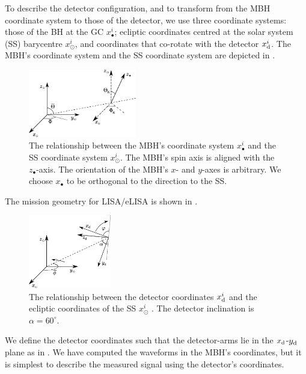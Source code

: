 To describe the detector configuration, and to transform from the MBH coordinate system to those of the detector, we use three coordinate systems: those of the BH at the GC $x_\bullet^i$; ecliptic coordinates centred at the solar system (SS) barycentre $x_\odot^i$, and coordinates that co-rotate with the detector $x_\mathrm{d}^i$. The MBH's coordinate system and the SS coordinate system are depicted in .
\begin{figure}
\begin{center}
 \includegraphics[width=0.42\textwidth]{./images/BH_SS_angles}
    \caption{The relationship between the MBH's coordinate system $x_\bullet^i$ and the SS coordinate system $x_\odot^i$. The MBH's spin axis is aligned with the $z_\bullet$-axis. The orientation of the MBH's $x$- and $y$-axes is arbitrary. We choose $x_\bullet$ to be orthogonal to the direction to the SS.}
   \label{fig:BH_SS}
\end{center}
\end{figure}
The mission geometry for LISA/eLISA is shown in .
\begin{figure}
\begin{center}
 \includegraphics[width=0.32\textwidth]{./images/SS_LISA}
    \caption{The relationship between the detector coordinates $x_\mathrm{d}^i$ and the ecliptic coordinates of the SS $x_\odot^i$ \citep{Bender1998, Jennrich2011}. The detector inclination is $\alpha = 60^{\circ}$.}
   \label{fig:SS_LISA}
\end{center}
\end{figure}
We define the detector coordinates such that the detector-arms lie in the $x_\mathrm{d}$-$y_\mathrm{d}$ plane as in \citet{Cutler1998}. We have computed the waveforms in the MBH's coordinates, but it is simplest to describe the measured signal using the detector's coordinates.

